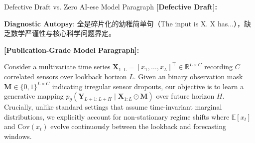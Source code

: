 \begin{ExampleBox}{Defective Draft vs. Zero AI-ese Model Paragraph}
\textbf{\color{TargetHighlight}[Defective Draft]:}\par
{}\par\vspace{4pt}
\textbf{Diagnostic Autopsy}: 全是碎片化的幼稚简单句（The input is X. X has...），缺乏数学严谨性与核心科学问题界定。\par\vspace{6pt}
\textbf{\color{AcadNavy}[Publication-Grade Model Paragraph]:}\par
Consider a multivariate time series $\mathbf{X}_{1:L} = [x_1, \dots, x_L]^\top \in \mathbb{R}^{L \times C}$ recording $C$ correlated sensors over lookback horizon $L$. Given an binary observation mask $\mathbf{M} \in \{0, 1\}^{L \times C}$ indicating irregular sensor dropouts, our objective is to learn a generative mapping $p_\theta(\mathbf{Y}_{L+1:L+H} \mid \mathbf{X}_{1:L} \odot \mathbf{M})$ over future horizon $H$. Crucially, unlike standard settings that assume time-invariant marginal distributions, we explicitly account for non-stationary regime shifts where $\mathbb{E}[x_t]$ and $\text{Cov}(x_t)$ evolve continuously between the lookback and forecasting windows.
\end{ExampleBox}
